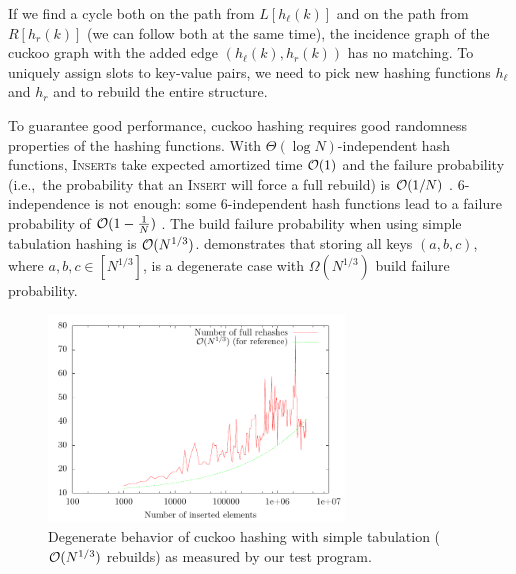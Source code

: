 If we find a cycle both on the path from $L[h_\ell(k)]$ and on the path from
$R[h_r(k)]$ (we can follow both at the same time), the incidence graph
of the cuckoo graph with the added edge $(h_\ell(k),h_r(k))$ has no matching.
To uniquely assign slots to key-value pairs, we need to pick new hashing
functions $h_\ell$ and $h_r$ and to rebuild the entire structure.

To guarantee good performance, cuckoo hashing requires good randomness
properties of the hashing functions.
With $\Theta(\log N)$-independent hash functions, \textsc{Insert}s take
expected amortized time $\mathcal{O}(1)$ and the failure probability (i.e.,\ the
probability that an \textsc{Insert} will force a full rebuild) is
$\mathcal{O}(1/N)$ \cite{cuckoo-hashing}.
6-independence is not enough: some 6-independent hash functions lead to a
failure probability of $\mathcal{O}(1-\frac{1}{N})$ \cite{cuckoo-hashing-indep-bounds}.
The build failure probability when using simple tabulation hashing is
$\mathcal{O}(N^{1/3})$. \cite{power-of-simple-tab} demonstrates that storing all keys
$(a,b,c)$, where $a,b,c\in[N^{1/3}]$, is a degenerate case with
$\Omega(N^{1/3})$ build failure probability.

\begin{figure}
	\centering
	\includegraphics[width=0.7\textwidth]{img/cuckoo/results}
	\caption{Degenerate behavior of cuckoo hashing
		with simple tabulation ($\mathcal{O}(N^{1/3})$ rebuilds)
		as measured by our test program.}
\end{figure}

